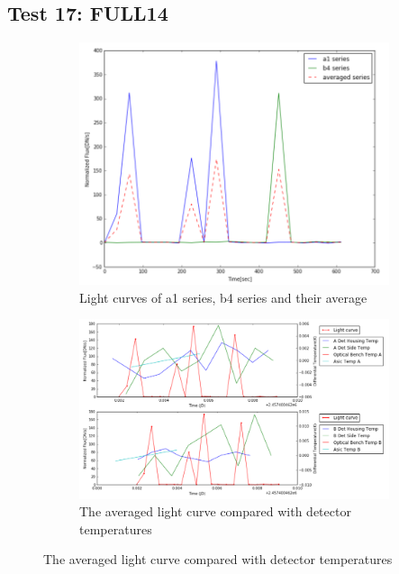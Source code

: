 \documentclass{aastex6}
\begin{document}
\subsection{Test 17: FULL14} 
\begin{figure}[H]
    \centering
    \begin{subfigure}{1}
        \includegraphics[scale=0.4]{ts_test17}
        \caption{Light curves of a1 series, b4 series and their average}
    \end{subfigure}

    \begin{subfigure}{2}
        \includegraphics[scale=0.4]{temp_test17}
        \caption{The averaged light curve compared with detector temperatures}
    \end{subfigure}
   

\end{figure}
\end{document}
